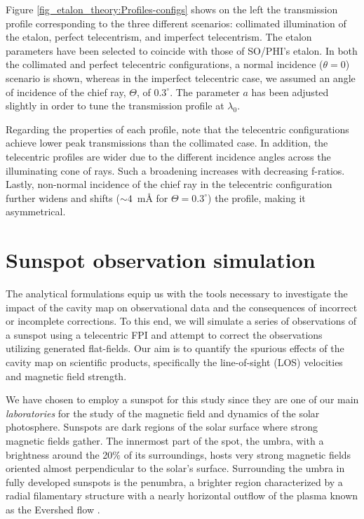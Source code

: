 Figure \ref{fig_etalon_theory:Profiles-configs} shows on the left the transmission profile corresponding to the three different scenarios: collimated illumination of the etalon, perfect telecentrism, and imperfect telecentrism. The etalon parameters have been selected to coincide with those of SO/PHI's etalon. In both the collimated and perfect telecentric configurations, a normal incidence  ($\theta = 0$) scenario is shown, whereas in the imperfect telecentric case, we assumed an angle of incidence of the chief ray, $\Theta$, of $0.3^{\circ}$. The parameter $a$ has been adjusted slightly in order to tune the transmission profile at $\lambda _ 0$. 

Regarding the properties of each profile, note that the telecentric configurations achieve lower peak transmissions than the collimated case. In addition, the telecentric profiles are wider due to the different incidence angles across the illuminating cone of rays. Such a broadening increases with decreasing f-ratios. Lastly, non-normal incidence of the chief ray in the telecentric configuration further widens and shifts ($\sim 4$~m\r{A}
for $\Theta=0.3^\circ$) the profile, making it asymmetrical. 

\section{\label{sect: Mancha_obs}Sunspot observation simulation}

The analytical formulations equip us with the tools necessary to investigate the impact of the cavity map on observational data and the consequences of incorrect or incomplete corrections. To this end, we will simulate a series of observations of a sunspot using a telecentric FPI and attempt to correct the observations utilizing generated flat-fields. Our aim is to quantify the spurious effects of the cavity map on scientific products, specifically the line-of-sight (LOS) velocities and magnetic field strength.

We have chosen to employ a sunspot for this study since they are one of our main \textit{laboratories} for the study of the magnetic field and dynamics of the solar photosphere. Sunspots are dark regions of the solar surface where strong magnetic fields gather. The innermost part of the spot, the umbra, with a brightness around the 20$\%$ of its surroundings, hosts very strong magnetic fields oriented almost perpendicular to the solar's surface. Surrounding the umbra in fully developed sunspots is the penumbra, a brighter region characterized by a radial filamentary structure with a nearly horizontal outflow of the plasma known as the Evershed flow \citep{evershed}.

